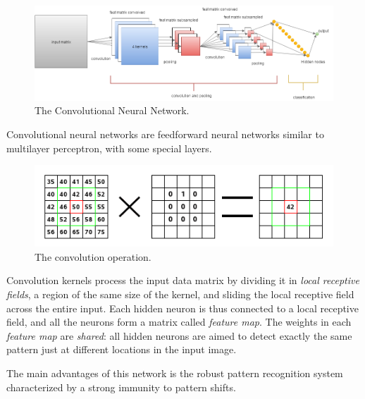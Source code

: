 \begin{enumerate}
	\begin{figure}
		\centering
		\includegraphics[width=0.9\columnwidth]{img/CNN}
		\caption{The Convolutional Neural Network.}
	\end{figure}
	
	
	Convolutional neural networks are feedforward neural networks similar to multilayer perceptron, with some special layers.
	
	
	\begin{figure}[t]
		\centering
		\includegraphics[width=0.7\columnwidth]{img/convolution-calculate}
		\caption{The convolution operation.}
	\end{figure}
	
	
	
	Convolution kernels process the input data matrix by dividing it in \textit{local receptive fields}, a region of the same size of the kernel, and sliding the local receptive field across the entire input.
	Each hidden neuron is thus connected to a local receptive field, and all the neurons form a matrix called \textit{feature map}.
	The weights in each \textit{feature map} are \textit{shared}: all hidden neurons are aimed to detect exactly the same pattern just at different locations in the input image. 
	
	The main advantages of this network is the robust pattern recognition system characterized by a strong immunity to pattern shifts.
	

\end{enumerate}
